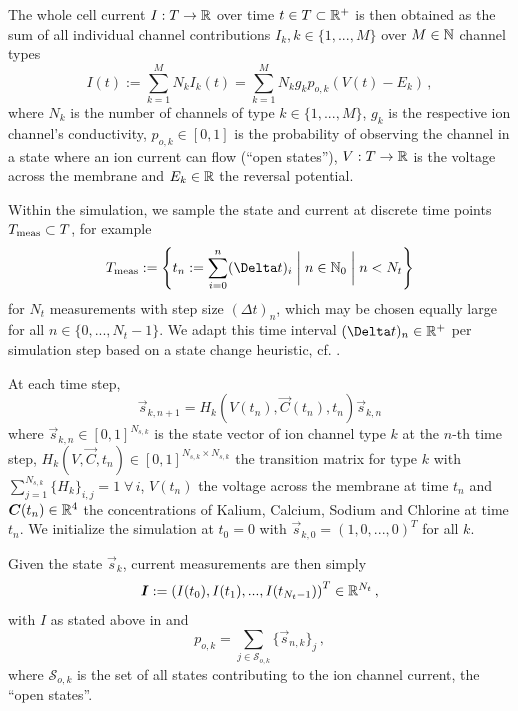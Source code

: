 \documentclass[USenglish,twocolumn]{article}
\begin{document}
  The whole cell current $I: T \rightarrow \mathbb{R}$ over time $t \in T \subset \mathbb{R}^+$ is then obtained as the sum of all individual channel contributions $I_k, k \in \{1, ..., M\}$ over $M \in \mathbb{N}$ channel types
  \begin{equation}
    I(t) := \sum_{k=1}^{M} N_k I_k(t) = \sum_{k=1}^{M} N_k g_k p_{o,k} \left(V(t)-E_k\right)\,,
    \label{eq:current}
  \end{equation}
  where $N_k$ is the number of channels of type $k \in \{1, ..., M\}$, $g_k$ is the respective ion channel's conductivity, $p_{o, k} \in [0, 1]$ is the probability of observing the channel in a state where an ion current can flow (``open states''), $V: T \rightarrow \mathbb{R}$ is the voltage across the membrane and $E_k \in \mathbb{R}$ the reversal potential.

  Within the simulation, we sample the state and current at discrete time points $T_{\rm meas} \subset T$, for example
  $$T_{\rm meas} := \left\{t_n := \sum_{i=0}^n (\Delta t)_i \;\bigg|\; n \in \N_0 \;\bigg|\; n < N_t\right\}$$
  for $N_t$ measurements with step size $(\Delta t)_n$, which may be chosen equally large for all $n \in \{0, ..., N_t - 1\}$.
  We adapt this time interval $(\Delta t)_n \in \R^+$ per simulation step based on a state change heuristic, cf. .

  At each time step,
  \begin{equation}
    \vec{s}_{k,n+1} = H_{k}\left(V(t_n), \vec{C}(t_n), t_n\right) \vec{s}_{k,n}
  \end{equation}
  where $\vec{s}_{k,n} \in [0, 1]^{N_{s,k}}$ is the state vector of ion channel type $k$ at the $n$-th time step, $H_{k}\left(V, \vec{C}, t_n\right) \in [0, 1]^{N_{s,k} \times N_{s,k}}$ the transition matrix for type $k$ with $\sum_{j=1}^{N_{s,k}} \{H_k\}_{i,j} = 1 \;\forall\,i$, $V(t_n)$ the voltage across the membrane at time $t_n$ and ${\bm{C}}(t_n) \in \mathbb{R}^4$ the concentrations of Kalium, Calcium, Sodium and Chlorine at time $t_n$.
  We initialize the simulation at $t_0 = 0$ with $\vec{s}_{k,0} = (1, 0, ..., 0)^T$ for all $k$.

  Given the state $\vec{s}_{k}$, current measurements are then simply
  $${\bm{I}} := \left(I(t_0), I(t_1), ..., I(t_{N_t-1})\right)^T \in \mathbb{R}^{N_t}\,,$$
  with $I$ as stated above in  and
  $$p_{o,k} = \sum_{j \in \mathcal{S}_{o,k}} \{\vec{s}_{n,k}\}_{j}\,,$$
  where $\mathcal{S}_{o,k}$ is the set of all states contributing to the ion channel current, the ``open states''.
\end{document}
